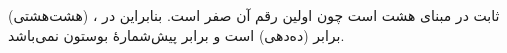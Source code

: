 \section{}
\paragraph{}\label{answer:15}
ثابت  در مبنای هشت است چون اولین رقم آن صفر است. بنابراین در ،  (هشت‌هشتی) برابر  (ده‌دهی) است و برابر پیش‌شمارهٔ بوستون نمی‌باشد.